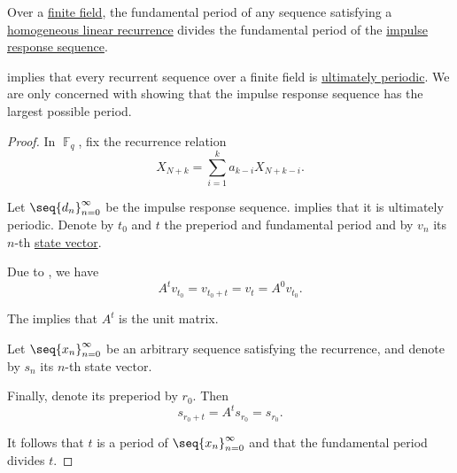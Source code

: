 \begin{proposition}\label{thm:impulse_response_sequence_period}
  Over a \hyperref[def:finite_field]{finite field}, the fundamental period of any sequence satisfying a \hyperref[def:homogeneous_linear_recurrence]{homogeneous linear recurrence} divides the fundamental period of the \hyperref[def:recurrence_relation_space]{impulse response sequence}.
\end{proposition}
\begin{comments}
  \item {} implies that every recurrent sequence over a finite field is \hyperref[def:ultimately_periodic_sequence]{ultimately periodic}. We are only concerned with showing that the impulse response sequence has the largest possible period.
\end{comments}
\begin{proof}
  In \( \BbbF_q \), fix the recurrence relation
  \begin{equation*}
    X_{N+k} = \sum_{i=1}^k a_{k-i} X_{N+k-i}.
  \end{equation*}

  Let \( \seq{ d_n }_{n=0}^\infty \) be the impulse response sequence.  implies that it is ultimately periodic. Denote by \( t_0 \) and \( t \) the preperiod and fundamental period and by \( v_n \) its \( n \)-th \hyperref[def:recurrence_relation/state]{state vector}.

  Due to , we have
  \begin{equation*}
    A^t v_{t_0} = v_{t_0 + t} = v_t = A^0 v_{t_0}.
  \end{equation*}

  The  implies that \( A^t \) is the unit matrix.

  Let \( \seq{ x_n }_{n=0}^\infty \) be an arbitrary sequence satisfying the recurrence, and denote by \( s_n \) its \( n \)-th state vector.

  Finally, denote its preperiod by \( r_0 \). Then
  \begin{equation*}
    s_{r_0 + t}
    =
    A^t s_{r_0}
    =
    s_{r_0}.
  \end{equation*}

  It follows that \( t \) is a period of \( \seq{ x_n }_{n=0}^\infty \) and that the fundamental period divides \( t \).
\end{proof}

